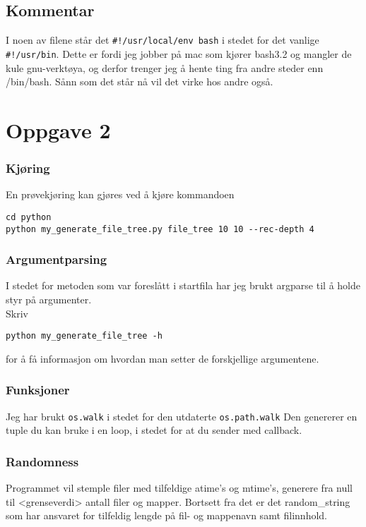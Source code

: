 \documentclass{article}
\newcommand{\code}[1]{\colorbox{codegray}{\texttt{#1}}}
\begin{document}
\subsection*{Kommentar}
I noen av filene står det \code{\#!/usr/local/env bash} i stedet
for det vanlige \code{\#!/usr/bin}. Dette er fordi jeg jobber
på mac som kjører bash3.2 og mangler de kule gnu-verktøya, og derfor
trenger jeg å hente ting fra andre steder enn /bin/bash.
Sånn som det står nå vil det virke hos andre også.


\section*{Oppgave 2}


\subsubsection*{Kjøring}
En prøvekjøring kan gjøres ved å kjøre kommandoen
\begin{verbatim}
cd python
python my_generate_file_tree.py file_tree 10 10 --rec-depth 4
\end{verbatim}

\subsubsection*{Argumentparsing}
I stedet for metoden som var foreslått i startfila har jeg brukt
argparse til å holde styr på argumenter.\\

Skriv
\begin{verbatim}
python my_generate_file_tree -h
\end{verbatim}
for å få informasjon om hvordan man setter de forskjellige argumentene.


\subsubsection*{Funksjoner}
  Jeg har brukt \code{os.walk} i stedet for den utdaterte \code{os.path.walk}
  Den genererer en tuple du kan bruke i en loop, i stedet for at du sender
  med callback.

\subsubsection*{Randomness}
  Programmet vil stemple filer med tilfeldige atime's og mtime's,
  generere fra null til <grenseverdi> antall filer og mapper.
  Bortsett fra det er det random\_string som har ansvaret for
  tilfeldig lengde på fil- og mappenavn samt filinnhold.
\end{document}
